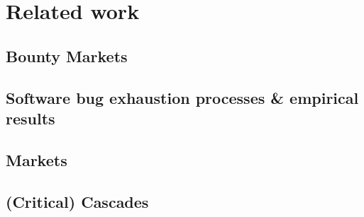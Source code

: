 \section{Related work}
\label{sec:related}

\subsection{Bounty Markets}

\subsection{Software bug exhaustion processes \& empirical results}

\subsection{Markets}

\subsection{(Critical) Cascades}
